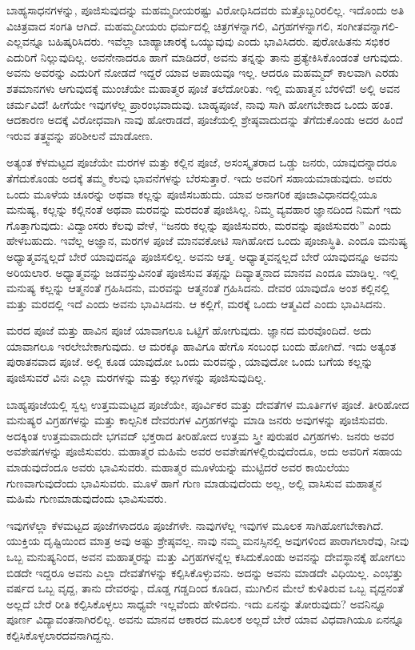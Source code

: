 ಬಾಹ್ಯಸಾಧನಗಳನ್ನು, ಪೂಜಿಸುವುದನ್ನು ಮಹಮ್ಮದೀಯರಷ್ಟು ವಿರೋಧಿಸಿದವರು ಮತ್ತೊಬ್ಬರಿರಲಿಲ್ಲ. ಇದೊಂದು ಅತಿ ವಿಚಿತ್ರವಾದ ಸಂಗತಿ ಆಗಿದೆ. ಮಹಮ್ಮದೀಯರು ಧರ್ಮದಲ್ಲಿ ಚಿತ್ರಗಳನ್ನಾಗಲಿ, ವಿಗ್ರಹಗಳನ್ನಾಗಲಿ, ಸಂಗೀತವನ್ನಾಗಲಿ-ಎಲ್ಲವನ್ನೂ ಬಹಿಷ್ಕರಿಸಿದರು. ಇವೆಲ್ಲಾ ಬಾಹ್ಯಾಚಾರಕ್ಕೆ ಒಯ್ಯುವುವು ಎಂದು ಭಾವಿಸಿದರು. ಪುರೋಹಿತನು ಸಭಿಕರ ಎದುರಿಗೆ ನಿಲ್ಲುವುದಿಲ್ಲ. ಅವನೇನಾದರೂ ಹಾಗೆ ಮಾಡಿದರೆ, ಅವನು ತನ್ನನ್ನು ತಾನು ಪ್ರತ್ಯೇಕಿಸಿಕೊಂಡಂತೆ ಆಗುವುದು. ಅವನು ಅವರನ್ನು ಎದುರಿಗೆ ನೋಡದೆ ಇದ್ದರೆ ಯಾವ ಅಪಾಯವೂ ಇಲ್ಲ. ಆದರೂ ಮಹಮ್ಮದ್ ಕಾಲವಾಗಿ ಎರಡು ಶತಮಾನಗಳು ಆಗುವುದಕ್ಕೆ ಮುಂಚೆಯೇ ಮಹಾತ್ಮರ ಪೂಜೆ ತಲೆದೋರಿತು. ಇಲ್ಲಿ ಮಹಾತ್ಮನ ಬೆರಳಿದೆ! ಅಲ್ಲಿ ಅವನ ಚರ್ಮವಿದೆ! ಹೀಗೆಯೇ ಇವುಗಳೆಲ್ಲ ಪ್ರಾರಂಭವಾದುವು. ಬಾಹ್ಯಪೂಜೆ, ನಾವು ಸಾಗಿ ಹೋಗಬೇಕಾದ ಒಂದು ಹಂತ. ಆದಕಾರಣ ಅದಕ್ಕೆ ವಿರೋಧವಾಗಿ ನಾವು ಹೋರಾಡದೆ, ಪೂಜೆಯಲ್ಲಿ ಶ್ರೇಷ್ಠವಾದುದನ್ನು ತೆಗೆದುಕೊಂಡು ಅದರ ಹಿಂದೆ ಇರುವ ತತ್ತ್ವವನ್ನು ಪರಿಶೀಲನೆ ಮಾಡೋಣ.

ಅತ್ಯಂತ ಕೆಳಮಟ್ಟದ ಪೂಜೆಯೇ ಮರಗಳ ಮತ್ತು ಕಲ್ಲಿನ ಪೂಜೆ, ಅಸಂಸ್ಕೃತರಾದ ಒಡ್ಡು ಜನರು, ಯಾವುದನ್ನಾದರೂ ತೆಗೆದುಕೊಂಡು ಅದಕ್ಕೆ ತಮ್ಮ ಕೆಲವು ಭಾವನೆಗಳನ್ನು ಬೆರಸುತ್ತಾರೆ. ಇದು ಅವರಿಗೆ ಸಹಾಯಮಾಡುವುದು. ಅವರು ಒಂದು ಮೂಳೆಯ ಚೂರನ್ನು ಅಥವಾ ಕಲ್ಲನ್ನು ಪೂಜಿಸಬಹುದು. ಯಾವ ಅನಾಗರಿಕ ಪೂಜಾವಿಧಾನದಲ್ಲಿಯೂ ಮನುಷ್ಯ, ಕಲ್ಲನ್ನು ಕಲ್ಲಿನಂತೆ ಅಥವಾ ಮರವನ್ನು ಮರದಂತೆ ಪೂಜಿಸಿಲ್ಲ. ನಿಮ್ಮ ವ್ಯವಹಾರ ಜ್ಞಾನದಿಂದ ನಿಮಗೆ ಇದು ಗೊತ್ತಾಗುವುದು: ವಿದ್ವಾಂಸರು ಕೆಲವು ವೇಳೆ, “ಜನರು ಕಲ್ಲನ್ನು ಪೂಜಿಸುವರು, ಮರವನ್ನು ಪೂಜಿಸುವರು” ಎಂದು ಹೇಳಬಹುದು. ಇವೆಲ್ಲ ಅಜ್ಞಾನ, ಮರಗಳ ಪೂಜೆ ಮಾನವಕೋಟಿ ಸಾಗಿಹೋದ ಒಂದು ಪೂಜಾಸ್ಥಿತಿ. ಎಂದೂ ಮನುಷ್ಯ ಅಧ್ಯಾತ್ಮವನ್ನಲ್ಲದೆ ಬೇರೆ ಯಾವುದನ್ನೂ ಪೂಜಿಸಲಿಲ್ಲ. ಅವನು ಆತ್ಮ. ಅಧ್ಯಾತ್ಮವನ್ನಲ್ಲದೆ ಬೇರೆ ಯಾವುದನ್ನೂ ಅವನು ಅರಿಯಲಾರ. ಅಧ್ಯಾತ್ಮವನ್ನು ಜಡವಸ್ತುವಿನಂತೆ ಪೂಜಿಸುವ ತಪ್ಪನ್ನು ದಿವ್ಯಾತ್ಮನಾದ ಮಾನವ ಎಂದೂ ಮಾಡಿಲ್ಲ. ಇಲ್ಲಿ ಮನುಷ್ಯ ಕಲ್ಲನ್ನು ಆತ್ಮನಂತೆ ಗ್ರಹಿಸಿದನು, ಮರವನ್ನು ಆತ್ಮನಂತೆ ಗ್ರಹಿಸಿದನು. ದೇವರ ಯಾವುದೊ ಅಂಶ ಕಲ್ಲಿನಲ್ಲಿ ಮತ್ತು ಮರದಲ್ಲಿ ಇದೆ ಎಂದು ಅವನು ಭಾವಿಸಿದನು. ಆ ಕಲ್ಲಿಗೆ, ಮರಕ್ಕೆ ಒಂದು ಆತ್ಮವಿದೆ ಎಂದು ಭಾವಿಸಿದನು.

ಮರದ ಪೂಜೆ ಮತ್ತು ಹಾವಿನ ಪೂಜೆ ಯಾವಾಗಲೂ ಒಟ್ಟಿಗೆ ಹೋಗುವುದು. ಜ್ಞಾನದ ಮರವೊಂದಿದೆ. ಅದು ಯಾವಾಗಲೂ ಇರಲೇಬೇಕಾಗುವುದು. ಆ ಮರಕ್ಕೂ ಹಾವಿಗೂ ಹೇಗೊ ಸಂಬಂಧ ಬಂದು ಹೋಗಿದೆ. ಇದು ಅತ್ಯಂತ ಪುರಾತನವಾದ ಪೂಜೆ. ಅಲ್ಲಿ ಕೂಡ ಯಾವುದೋ ಒಂದು ಮರವನ್ನು, ಯಾವುದೋ ಒಂದು ಬಗೆಯ ಕಲ್ಲನ್ನು ಪೂಜಿಸುವರೆ ವಿನಃ ಎಲ್ಲಾ ಮರಗಳನ್ನು ಮತ್ತು ಕಲ್ಲುಗಳನ್ನು ಪೂಜಿಸುವುದಿಲ್ಲ.

ಬಾಹ್ಯಪೂಜೆಯಲ್ಲಿ ಸ್ವಲ್ಪ ಉತ್ತಮಮಟ್ಟದ ಪೂಜೆಯೇ, ಪೂರ್ವಿಕರ ಮತ್ತು ದೇವತೆಗಳ ಮೂರ್ತಿಗಳ ಪೂಜೆ. ತೀರಿಹೋದ ಮನುಷ್ಯರ ವಿಗ್ರಹಗಳನ್ನು ಮತ್ತು ಕಾಲ್ಪನಿಕ ದೇವರುಗಳ ವಿಗ್ರಹಗಳನ್ನು ಮಾಡಿ ಜನರು ಅವುಗಳನ್ನು ಪೂಜಿಸುವರು. ಅದಕ್ಕಿಂತ ಉತ್ತಮವಾದುದೇ ಭಗವದ್ ಭಕ್ತರಾದ ತೀರಿಹೋದ ಉತ್ತಮ ಸ್ತ್ರೀ ಪುರುಷರ ವಿಗ್ರಹಗಳು. ಜನರು ಅವರ ಅವಶೇಷಗಳನ್ನು ಪೂಜಿಸುವರು. ಮಹಾತ್ಮರ ಮಹಿಮೆ ಅವರ ಅವಶೇಷಗಳಲ್ಲಿರುವುದೆಂದೂ, ಅದು ಅವರಿಗೆ ಸಹಾಯ ಮಾಡುವುದೆಂದೂ ಅವರು ಭಾವಿಸುವರು. ಮಹಾತ್ಮರ ಮೂಳೆಯನ್ನು ಮುಟ್ಟಿದರೆ ಅವರ ಕಾಯಿಲೆಯು ಗುಣವಾಗುವುದೆಂದು ಭಾವಿಸುವರು. ಮೂಳೆ ಹಾಗೆ ಗುಣ ಮಾಡುವುದೆಂದು ಅಲ್ಲ, ಅಲ್ಲಿ ವಾಸಿಸುವ ಮಹಾತ್ಮನ ಮಹಿಮೆ ಗುಣಮಾಡುವುದೆಂದು ಭಾವಿಸುವರು.

ಇವುಗಳೆಲ್ಲಾ ಕೆಳಮಟ್ಟದ ಪೂಜೆಗಳಾದರೂ ಪೂಜೆಗಳೇ. ನಾವುಗಳೆಲ್ಲ ಇವುಗಳ ಮೂಲಕ ಸಾಗಿಹೋಗಬೇಕಾಗಿದೆ. ಯುಕ್ತಿಯ ದೃಷ್ಟಿಯಿಂದ ಮಾತ್ರ ಅವು ಅಷ್ಟು ಶ್ರೇಷ್ಠವಲ್ಲ. ನಾವು ನಮ್ಮ ಮನಸ್ಸಿನಲ್ಲಿ ಅವುಗಳಿಂದ ಪಾರಾಗಲಾರೆವು, ನೀವು ಒಬ್ಬ ಮನುಷ್ಯನಿಂದ, ಅವನ ಮಹಾತ್ಮರನ್ನು ಮತ್ತು ವಿಗ್ರಹಗಳನ್ನೆಲ್ಲ ಕಸಿದುಕೊಂಡು ಅವನನ್ನು ದೇವಸ್ಥಾನಕ್ಕೆ ಹೋಗಲು ಬಿಡದೇ ಇದ್ದರೂ ಅವನು ಎಲ್ಲಾ ದೇವತೆಗಳನ್ನು ಕಲ್ಪಿಸಿಕೊಳ್ಳುವನು. ಅದನ್ನು ಅವನು ಮಾಡದೇ ವಿಧಿಯಿಲ್ಲ. ಎಂಭತ್ತು ವರ್ಷದ ಒಬ್ಬ ವೃದ್ದ, ತಾನು ದೇವರನ್ನು, ದೊಡ್ಡ ಗಡ್ಡದಿಂದ ಕೂಡಿದ, ಮುಗಿಲಿನ ಮೇಲೆ ಕುಳಿತಿರುವ ಒಬ್ಬ ವೃದ್ದನಂತೆ ಅಲ್ಲದೆ ಬೇರೆ ರೀತಿ ಕಲ್ಪಿಸಿಕೊಳ್ಳಲು ಸಾಧ್ಯವೇ ಇಲ್ಲವೆಂದು ಹೇಳಿದನು. ಇದು ಏನನ್ನು ತೋರುವುದು? ಅವನಿನ್ನೂ ಪೂರ್ಣ ವಿದ್ಯಾವಂತನಾಗಿರಲಿಲ್ಲ. ಅವನು ಮಾನವ ಆಕಾರದ ಮೂಲಕ ಅಲ್ಲದೆ ಬೇರೆ ಯಾವ ವಿಧವಾಗಿಯೂ ಏನನ್ನೂ ಕಲ್ಪಿಸಿಕೊಳ್ಳಲಾರದವನಾಗಿದ್ದನು.

